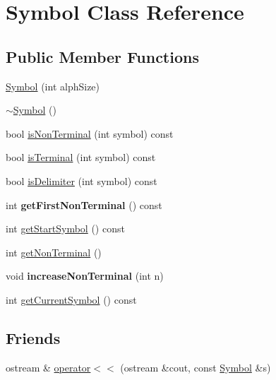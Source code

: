 \hypertarget{classSymbol}{\section{Symbol Class Reference}
\label{classSymbol}
}
\subsection*{Public Member Functions}
\begin{DoxyCompactItemize}
\item 
\hyperlink{classSymbol_ac4ace96325f7d27f0c79beee1625cee6}{Symbol} (int alph\-Size)
\item 
\hyperlink{classSymbol_a505360ad4bd2e0bd1e3954eca1b05723}{$\sim$\-Symbol} ()
\item 
bool \hyperlink{classSymbol_a5631acc6635697133072b5c42c00fb14}{is\-Non\-Terminal} (int symbol) const 
\item 
bool \hyperlink{classSymbol_ac2c678564d37f7da8258f9ee43d526d3}{is\-Terminal} (int symbol) const 
\item 
bool \hyperlink{classSymbol_ab6291680c1ccde7a13b589fc448efbbc}{is\-Delimiter} (int symbol) const 
\item 
\hypertarget{classSymbol_ae1181afd00a9c66dbdc67bee4091d152}{int {\bfseries get\-First\-Non\-Terminal} () const }\label{classSymbol_ae1181afd00a9c66dbdc67bee4091d152}

\item 
int \hyperlink{classSymbol_ab0ea968b00accbaddb7086bf7a719bc4}{get\-Start\-Symbol} () const 
\item 
int \hyperlink{classSymbol_af2be74ae7e24fd0bc058e856d97388e7}{get\-Non\-Terminal} ()
\item 
\hypertarget{classSymbol_a3cdc637bc61551e0ce4334a1162e8f7f}{void {\bfseries increase\-Non\-Terminal} (int n)}\label{classSymbol_a3cdc637bc61551e0ce4334a1162e8f7f}

\item 
int \hyperlink{classSymbol_aa25b584739717c9659acee41b2759f3f}{get\-Current\-Symbol} () const 
\end{DoxyCompactItemize}
\subsection*{Friends}
\begin{DoxyCompactItemize}
\item 
ostream \& \hyperlink{classSymbol_a2361b1d1aff8081f2f7fee0dbfa6e701}{operator$<$$<$} (ostream \&cout, const \hyperlink{classSymbol}{Symbol} \&s)
\end{DoxyCompactItemize}


